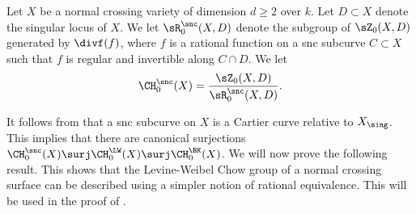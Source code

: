 Let $X$ be a normal crossing variety of dimension $d \ge 2$ over $k$.
Let $D \subset X$ denote the singular locus of $X$. We let
$\sR^{\snc}_0(X,D)$ denote the subgroup of $\sZ_0(X,D)$ generated by
$\divf(f)$, where $f$ is a rational function on a snc subcurve
$C \subset X$ such that $f$ is regular and invertible along $C \cap D$.
We let
\begin{equation}\label{eqn:snc-Chow}
\CH^{\snc}_0(X) = \frac{\sZ_0(X,D)}{\sR^{\snc}_0(X,D)}.
\end{equation}

It follows from  that a snc subcurve on $X$ is
a Cartier curve relative to $X_{\sing}$. This implies that there are
canonical surjections $\CH^{\snc}_0(X) \surj \CH^{\LW}_0(X) \surj \CH_0^{\BK}(X)$.
We will now prove the following result.
This shows that the Levine-Weibel Chow group of a normal crossing surface
can be described using a simpler notion of rational equivalence.
This will be used in the proof of .

